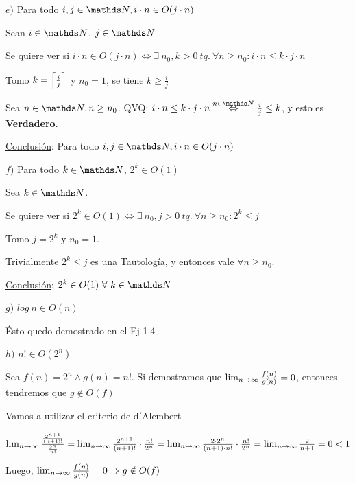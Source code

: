 \documentclass[10pt,a4paper]{article}
\begin{document}
\demoline
\demoline
\par $e)$ Para todo \ensuremath{i, j \in \nat, i \cdot n \in O(j \cdot n)}
\demoline
\begin{groupIzq}{2.5em}
  \par Sean \ensuremath{i \in \nat}, \ensuremath{j \in \nat}
  \par Se quiere ver si \ensuremath{i \cdot n \in O(j \cdot n) \Leftrightarrow \exists\ n_0, k > 0\ tq.\ \forall n \geq n_0 : i \cdot n \leq k \cdot j \cdot n}
  \par Tomo \ensuremath{k = \ceil{\frac{i}{j}}} y \ensuremath{n_0 = 1}, se tiene \ensuremath{k \geq \frac{i}{j}}
  \par Sea \ensuremath{n \in \nat, n \geq n_0}. QVQ: \ensuremath{i \cdot n \leq k \cdot j \cdot n \overset{n \in \nat}{\Leftrightarrow} \frac{i}{j} \leq k}, y esto es \textbf{Verdadero}.
  \par \underline{Conclusión}: Para todo \ensuremath{i, j \in \nat, i \cdot n \in O(j \cdot n)}
\end{groupIzq}

\demoline
\demoline
\par $f)$ Para todo \ensuremath{k \in \nat}, \ensuremath{2^k \in O(1)}
\demoline
\begin{groupIzq}{2.5em}
  \par Sea \ensuremath{k \in \nat}.
  \par Se quiere ver si \ensuremath{2^k \in O(1) \Leftrightarrow \exists\ n_0, j > 0\ tq.\ \forall n \geq n_0 : 2^k \leq j}
  \par Tomo \ensuremath{j = 2^k} y \ensuremath{n_0 = 1}.
  \par Trivialmente \ensuremath{2^k \leq j} es una Tautología, y entonces vale \ensuremath{\forall n \geq n_0}. 
  \par \underline{Conclusión}: \ensuremath{2^k \in O(1)\ \forall\ k \in \nat}
\end{groupIzq}
\demoline

\demoline
\demoline
\par $g)$ \ensuremath{log\ n \in O(n)}
\demoline
\begin{groupIzq}{2.5em}
  \par Ésto quedo demostrado en el Ej 1.4
\end{groupIzq}

\demoline
\demoline
\par $h)$ \ensuremath{n! \in O(2^n)}
\demoline
\begin{groupIzq}{2.5em}
  \par Sea \ensuremath{f(n) = 2^n \land g(n) = n!}. Si demostramos que \ensuremath{\limn \frac{f(n)}{g(n)} = 0}, entonces tendremos que \ensuremath{g \notin O(f)}
  \par Vamos a utilizar el criterio de d$'$Alembert
  \par \ensuremath{\limn\frac{\frac{2^{n+1}}{(n+1)!}}{\frac{2^n}{n!}} = \limn\frac{2^{n+1}}{(n+1)!}\cdot\frac{n!}{2^n} = \limn\frac{2\cdot2^n}{(n+1)\cdot n!}\cdot\frac{n!}{2^n} = \limn\frac{2}{n+1} = 0 < 1}
  \par Luego, \ensuremath{\limn \frac{f(n)}{g(n)} = 0 \Rightarrow g \notin O(f)}
\end{groupIzq}
\end{document}
